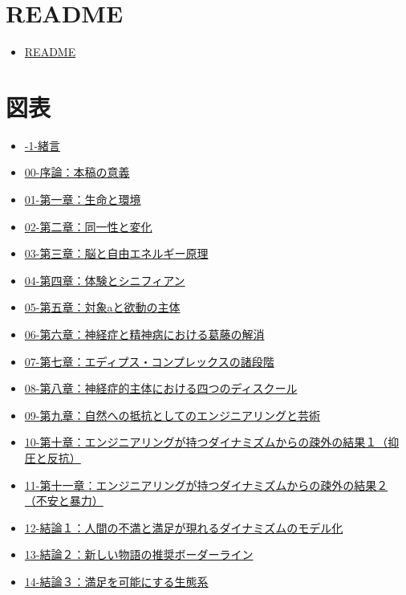 \documentclass[
]{ltjsarticle}
\author{}
\date{}
\providecommand{\tightlist}{%
  \setlength{\itemsep}{0pt}\setlength{\parskip}{0pt}}
\begin{document}
\section{README}\label{readme}

\begin{itemize}
\tightlist
\item
  \href{aoko-yano-public/personal_knowledge_management/stock/text/虚無・無知・飢餓―不安の時代における諸学の綜合/README}{README}
\end{itemize}

\section{図表}\label{ux56f3ux8868}

\begin{itemize}
\tightlist
\item
  \url{-1-緒言}
\item
  \url{00-序論：本稿の意義}
\item
  \url{01-第一章：生命と環境}
\item
  \url{02-第二章：同一性と変化}
\item
  \url{03-第三章：脳と自由エネルギー原理}
\item
  \url{04-第四章：体験とシニフィアン}
\item
  \url{05-第五章：対象aと欲動の主体}
\item
  \url{06-第六章：神経症と精神病における葛藤の解消}
\item
  \url{07-第七章：エディプス・コンプレックスの諸段階}
\item
  \url{08-第八章：神経症的主体における四つのディスクール}
\item
  \url{09-第九章：自然への抵抗としてのエンジニアリングと芸術}
\item
  \url{10-第十章：エンジニアリングが持つダイナミズムからの疎外の結果１（抑圧と反抗）}
\item
  \url{11-第十一章：エンジニアリングが持つダイナミズムからの疎外の結果２（不安と暴力）}
\item
  \url{12-結論１：人間の不満と満足が現れるダイナミズムのモデル化}
\item
  \url{13-結論２：新しい物語の推奨ボーダーライン}
\item
  \url{14-結論３：満足を可能にする生態系}
\end{itemize}
\end{document}
